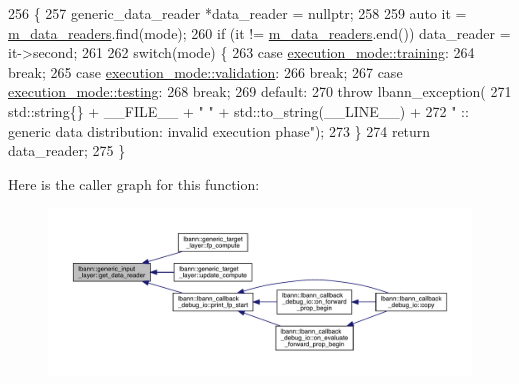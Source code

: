 \begin{DoxyCode}
256                                                                         \{
257     generic\_data\_reader *data\_reader = \textcolor{keyword}{nullptr};
258 
259     \textcolor{keyword}{auto} it = \hyperlink{classlbann_1_1generic__input__layer_a6bc18860c02beed0252ea3cc87bc48d2}{m\_data\_readers}.find(mode);
260     \textcolor{keywordflow}{if} (it != \hyperlink{classlbann_1_1generic__input__layer_a6bc18860c02beed0252ea3cc87bc48d2}{m\_data\_readers}.end()) data\_reader = it->second;
261 
262     \textcolor{keywordflow}{switch}(mode) \{
263     \textcolor{keywordflow}{case} \hyperlink{base_8hpp_a2781a159088df64ed7d47cc91c4dc0a8ac185ddac8b5a8f5aa23c5b80bc12d214}{execution\_mode::training}:
264       \textcolor{keywordflow}{break};
265     \textcolor{keywordflow}{case} \hyperlink{base_8hpp_a2781a159088df64ed7d47cc91c4dc0a8aa617908b172c473cb8e8cda059e55bf0}{execution\_mode::validation}:
266       \textcolor{keywordflow}{break};
267     \textcolor{keywordflow}{case} \hyperlink{base_8hpp_a2781a159088df64ed7d47cc91c4dc0a8aae2b1fca515949e5d54fb22b8ed95575}{execution\_mode::testing}:
268       \textcolor{keywordflow}{break};
269     \textcolor{keywordflow}{default}:
270       \textcolor{keywordflow}{throw} lbann\_exception(
271                             std::string\{\} + \_\_FILE\_\_ + \textcolor{stringliteral}{" "} + std::to\_string(\_\_LINE\_\_) +
272                             \textcolor{stringliteral}{" :: generic data distribution: invalid execution phase"});
273     \}
274     \textcolor{keywordflow}{return} data\_reader;
275   \}
\end{DoxyCode}
Here is the caller graph for this function\+:\nopagebreak
\begin{figure}[H]
\begin{center}
\leavevmode
\includegraphics[width=350pt]{classlbann_1_1generic__input__layer_a5715a966647e8cc92489f9e1950b2d28_icgraph}
\end{center}
\end{figure}
\mbox{\label{classlbann_1_1generic__input__layer_aba732becdb02627e3ad4493ac19e8fb6}} 
